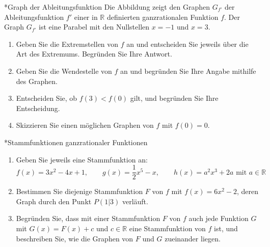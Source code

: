 \begin{uebung}*{Graph der Ableitungsfunktion}
Die Abbildung zeigt den Graphen $G_{f'}$ der Ableitungsfunktion $f'$ einer in $\mathds{R}$ definierten ganzrationalen Funktion $f$. Der Graph $G_{f'}$ ist eine Parabel mit den Nullstellen $x=-1$ und $x=3$.
\begin{center}
\end{center}
\begin{enumerate}[label=\alph*)]
  \item Geben Sie die Extremstellen von $f$ an und entscheiden Sie jeweils über die Art des Extremums. Begründen Sie Ihre Antwort.
  \item Geben Sie die Wendestelle von $f$ an und begründen Sie Ihre Angabe mithilfe des Graphen.
  \item Entscheiden Sie, ob $f(3) < f(0)$ gilt, und begründen Sie Ihre Entscheidung.
  \item Skizzieren Sie einen möglichen Graphen von $f$ mit $f(0)=0$.
\end{enumerate}
\end{uebung}


\begin{uebung}*{Stammfunktionen ganzrationaler Funktionen}
\begin{enumerate}[label=\alph*)]
  \item Geben Sie jeweils eine Stammfunktion an:
  \[f(x) = 3x^2-4x+1,\qquad g(x) = \dfrac{1}{2}x^5 - x,\qquad h(x) = a^2x^3+2a \text{ mit } a\in\mathds{R}\]
  \item Bestimmen Sie diejenige Stammfunktion $F$ von $f$ mit $f(x) = 6x^2-2$, deren Graph durch den Punkt $P(1|3)$ verläuft.
  \item Begründen Sie, dass mit einer Stammfunktion $F$ von $f$ auch jede Funktion $G$ mit $G(x) = F(x)+c$ und $c\in\mathds{R}$ eine Stammfunktion von $f$ ist, und beschreiben Sie, wie die Graphen von $F$ und $G$ zueinander liegen.
\end{enumerate}
\end{uebung}

